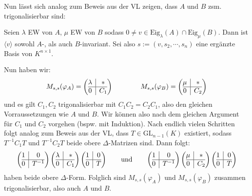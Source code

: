 \documentclass[a4paper,graphics,11pt]{article}
\begin{document}
\newpage

Nun lässt sich analog zum Beweis aus der VL zeigen, dass $A$ und $B$ zsm.
trigonalisierbar sind:

Seien $\lambda$ EW von $A$, $\mu$ EW von $B$ sodass $0 \neq v \in \text{Eig}_\lambda(A) \cap \text{Eig}_\mu(B)$. Dann ist $\langle v \rangle$ sowohl $A$-, als auch
$B$-invariant. Sei also $s := (v,s_2,\cdots,s_n)$ eine ergänzte Basis von $K^{n \times 1}$.

Nun haben wir:
$$
    M_{s,s}(\varphi_A) =
        \begin{array}({@{}c|c@{}})
            \lambda & *\\
            \hline
            0 & C_1
        \end{array}
    \qquad\qquad
    M_{s,s}(\varphi_B) =
        \begin{array}({@{}c|c@{}})
            \mu & *\\
            \hline
            0 & C_2
        \end{array}
$$
und es gilt $C_1,C_2$ trigonalisierbar mit $C_1C_2 = C_2C_1$, also den gleichen
Vorraussetzungen wie $A$ und $B$. Wir können also nach dem gleichen Argument für
$C_1$ und $C_2$ vorgehen (bspw. mit Induktion). Nach endlich vielen Schritten
folgt analog zum Beweis aus der VL, dass $T \in \text{GL}_{n-1}(K)$ existiert, sodass
$T^{-1}C_1T$ und $T^{-1}C_2T$ beide obere $\Delta$-Matrizen sind. Dann folgt:
$$
    \begin{array}({@{}c|c@{}})
        1 & 0\\
        \hline
        0 & T^{-1}
    \end{array}
    \begin{array}({@{}c|c@{}})
        \lambda & *\\
        \hline
        0 & C_1
    \end{array}
    \begin{array}({@{}c|c@{}})
        1 & 0\\
        \hline
        0 & T
    \end{array}
    \qquad\text{und}\qquad
    \begin{array}({@{}c|c@{}})
        1 & 0\\
        \hline
        0 & T^{-1}
    \end{array}
    \begin{array}({@{}c|c@{}})
        \mu & *\\
        \hline
        0 & C_2
    \end{array}
    \begin{array}({@{}c|c@{}})
        1 & 0\\
        \hline
        0 & T
    \end{array}
$$
haben beide obere $\Delta$-Form. Folglich sind $M_{s,s}(\varphi_A)$ und
$M_{s,s}(\varphi_B)$ zusammen trigonalisierbar, also auch $A$ und $B$.
\end{document}
